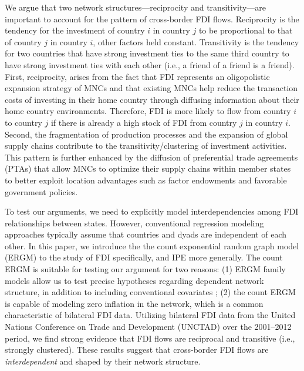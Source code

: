 \documentclass[reqno,onecolumn,letterpaper,12pt]{article}
\begin{document}
We argue that two network structures---reciprocity and transitivity---are important to account for the pattern of cross-border FDI flows. Reciprocity is the tendency for the investment of country $i$ in country $j$ to be proportional to that of country $j$ in country $i$, other factors held constant. Transitivity is the tendency for two countries that have strong investment ties to the same third country to have strong investment ties with each other (i.e., a friend of a friend is a friend). First, reciprocity, arises from the fact that FDI represents an oligopolistic expansion strategy of MNCs and that existing MNCs help reduce the transaction costs of investing in their home country through diffusing information about their home country environments. Therefore, FDI is more likely to flow from country $i$ to country $j$ if there is already a high stock of FDI from country $j$ in country $i$. %
Second, the fragmentation of production processes and the expansion of global supply chains contribute to the transitivity/clustering of investment activities. This pattern is further enhanced by the diffusion of preferential trade agreements (PTAs) that allow MNCs to optimize their supply chains within member states to better exploit location advantages such as factor endowments and favorable government policies.

To test our arguments, we need to explicitly model interdependencies among FDI relationships between states. However,  conventional regression modeling approaches typically assume that countries and dyads are independent of each other. In this paper, we introduce the the count exponential random graph model (ERGM) \citep{krivitsky2012exponential} to the study of FDI specifically, and IPE more generally. The count ERGM is suitable for testing our argument for two reasons: (1) ERGM family models allow us to test precise hypotheses regarding dependent network structure, in addition to including conventional covariates \citep{cranmer2016critique,desmarais2017statistical}; (2) the count ERGM is capable of modeling zero inflation in the network, which is a common characteristic of bilateral FDI data. Utilizing bilateral FDI data from the United Nations Conference on Trade and Development (UNCTAD) over the 2001--2012 period, we find strong evidence that FDI flows are reciprocal and transitive (i.e., strongly clustered). These results suggest that cross-border FDI flows are \textit{interdependent} and shaped by their network structure. %
\end{document}

